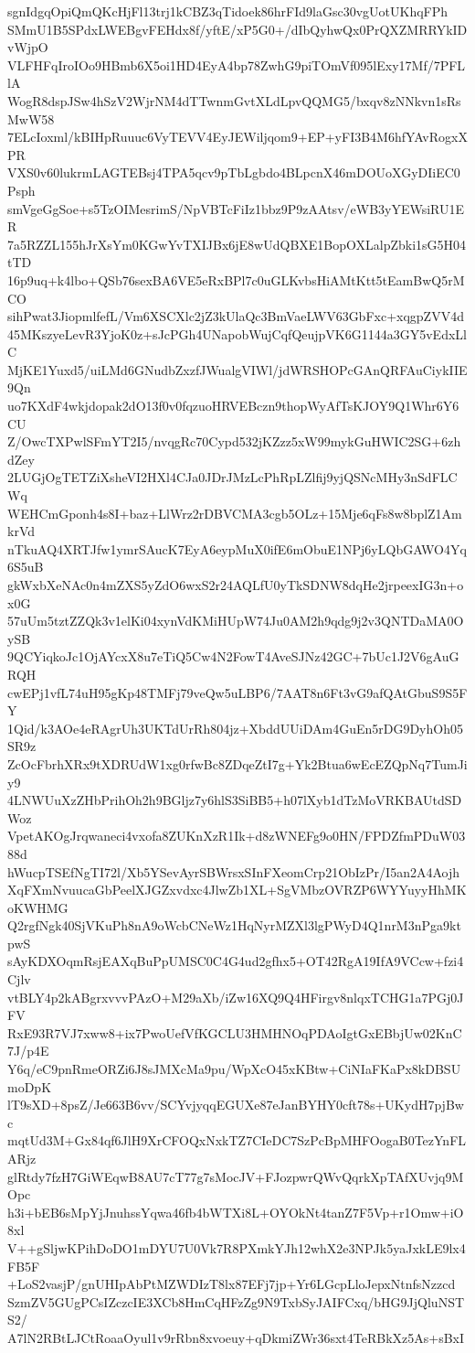 sgnIdgqOpiQmQKcHjFl13trj1kCBZ3qTidoek86hrFId9laGsc30vgUotUKhqFPh
SMmU1B5SPdxLWEBgvFEHdx8f/yftE/xP5G0+/dIbQyhwQx0PrQXZMRRYkIDvWjpO
VLFHFqIroIOo9HBmb6X5oi1HD4EyA4bp78ZwhG9piTOmVf095lExy17Mf/7PFLlA
WogR8dspJSw4hSzV2WjrNM4dTTwnmGvtXLdLpvQQMG5/bxqv8zNNkvn1sRsMwW58
7ELcIoxml/kBIHpRuuuc6VyTEVV4EyJEWiljqom9+EP+yFI3B4M6hfYAvRogxXPR
VXS0v60lukrmLAGTEBsj4TPA5qcv9pTbLgbdo4BLpcnX46mDOUoXGyDIiEC0Psph
smVgeGgSoe+s5TzOIMesrimS/NpVBTcFiIz1bbz9P9zAAtsv/eWB3yYEWsiRU1ER
7a5RZZL155hJrXsYm0KGwYvTXIJBx6jE8wUdQBXE1BopOXLalpZbki1sG5H04tTD
16p9uq+k4lbo+QSb76sexBA6VE5eRxBPl7c0uGLKvbsHiAMtKtt5tEamBwQ5rMCO
sihPwat3JiopmlfefL/Vm6XSCXlc2jZ3kUlaQc3BmVaeLWV63GbFxc+xqgpZVV4d
45MKszyeLevR3YjoK0z+sJcPGh4UNapobWujCqfQeujpVK6G1144a3GY5vEdxLlC
MjKE1Yuxd5/uiLMd6GNudbZxzfJWualgVIWl/jdWRSHOPcGAnQRFAuCiykIIE9Qn
uo7KXdF4wkjdopak2dO13f0v0fqzuoHRVEBczn9thopWyAfTsKJOY9Q1Whr6Y6CU
Z/OwcTXPwlSFmYT2I5/nvqgRc70Cypd532jKZzz5xW99mykGuHWIC2SG+6zhdZey
2LUGjOgTETZiXsheVI2HXl4CJa0JDrJMzLcPhRpLZlfij9yjQSNcMHy3nSdFLCWq
WEHCmGponh4s8I+baz+LlWrz2rDBVCMA3cgb5OLz+15Mje6qFs8w8bplZ1AmkrVd
nTkuAQ4XRTJfw1ymrSAucK7EyA6eypMuX0ifE6mObuE1NPj6yLQbGAWO4Yq6S5uB
gkWxbXeNAc0n4mZXS5yZdO6wxS2r24AQLfU0yTkSDNW8dqHe2jrpeexIG3n+ox0G
57uUm5tztZZQk3v1elKi04xynVdKMiHUpW74Ju0AM2h9qdg9j2v3QNTDaMA0OySB
9QCYiqkoJc1OjAYcxX8u7eTiQ5Cw4N2FowT4AveSJNz42GC+7bUc1J2V6gAuGRQH
cwEPj1vfL74uH95gKp48TMFj79veQw5uLBP6/7AAT8n6Ft3vG9afQAtGbuS9S5FY
1Qid/k3AOe4eRAgrUh3UKTdUrRh804jz+XbddUUiDAm4GuEn5rDG9DyhOh05SR9z
ZcOcFbrhXRx9tXDRUdW1xg0rfwBc8ZDqeZtI7g+Yk2Btua6wEcEZQpNq7TumJiy9
4LNWUuXzZHbPrihOh2h9BGljz7y6hlS3SiBB5+h07lXyb1dTzMoVRKBAUtdSDWoz
VpetAKOgJrqwaneci4vxofa8ZUKnXzR1Ik+d8zWNEFg9o0HN/FPDZfmPDuW0388d
hWucpTSEfNgTI72l/Xb5YSevAyrSBWrsxSInFXeomCrp21ObIzPr/I5an2A4Aojh
XqFXmNvuucaGbPeelXJGZxvdxc4JlwZb1XL+SgVMbzOVRZP6WYYuyyHhMKoKWHMG
Q2rgfNgk40SjVKuPh8nA9oWcbCNeWz1HqNyrMZXl3lgPWyD4Q1nrM3nPga9ktpwS
sAyKDXOqmRsjEAXqBuPpUMSC0C4G4ud2gfhx5+OT42RgA19IfA9VCcw+fzi4Cjlv
vtBLY4p2kABgrxvvvPAzO+M29aXb/iZw16XQ9Q4HFirgv8nlqxTCHG1a7PGj0JFV
RxE93R7VJ7xww8+ix7PwoUefVfKGCLU3HMHNOqPDAoIgtGxEBbjUw02KnC7J/p4E
Y6q/eC9pnRmeORZi6J8sJMXcMa9pu/WpXcO45xKBtw+CiNIaFKaPx8kDBSUmoDpK
lT9sXD+8psZ/Je663B6vv/SCYvjyqqEGUXe87eJanBYHY0cft78s+UKydH7pjBwc
mqtUd3M+Gx84qf6JlH9XrCFOQxNxkTZ7CIeDC7SzPcBpMHFOogaB0TezYnFLARjz
glRtdy7fzH7GiWEqwB8AU7cT77g7sMocJV+FJozpwrQWvQqrkXpTAfXUvjq9MOpc
h3i+bEB6sMpYjJnuhssYqwa46fb4bWTXi8L+OYOkNt4tanZ7F5Vp+r1Omw+iO8xl
V++gSljwKPihDoDO1mDYU7U0Vk7R8PXmkYJh12whX2e3NPJk5yaJxkLE9lx4FB5F
+LoS2vasjP/gnUHIpAbPtMZWDIzT8lx87EFj7jp+Yr6LGcpLloJepxNtnfsNzzcd
SzmZV5GUgPCsIZczcIE3XCb8HmCqHFzZg9N9TxbSyJAIFCxq/bHG9JjQluNSTS2/
A7lN2RBtLJCtRoaaOyul1v9rRbn8xvoeuy+qDkmiZWr36sxt4TeRBkXz5As+sBxI
